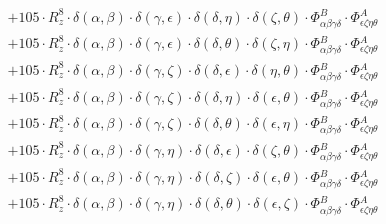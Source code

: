 \documentclass{article}
\begin{document}
\begin{equation}
\begin{array}{c}
 \\[0.2em] 		 + 105 \cdot R_{z}^{8} \cdot \delta{}\left(\alpha{}, \beta{}\right) \cdot \delta{}\left(\gamma{}, \epsilon{}\right) \cdot \delta{}\left(\delta{}, \eta{}\right) \cdot \delta{}\left(\zeta{}, \theta{}\right) \cdot \Phi{}^{B}_{\alpha{}\beta{}\gamma{}\delta{}} \cdot \Phi{}^{A}_{\epsilon{}\zeta{}\eta{}\theta{}} 
 \\[0.2em] 		 + 105 \cdot R_{z}^{8} \cdot \delta{}\left(\alpha{}, \beta{}\right) \cdot \delta{}\left(\gamma{}, \epsilon{}\right) \cdot \delta{}\left(\delta{}, \theta{}\right) \cdot \delta{}\left(\zeta{}, \eta{}\right) \cdot \Phi{}^{B}_{\alpha{}\beta{}\gamma{}\delta{}} \cdot \Phi{}^{A}_{\epsilon{}\zeta{}\eta{}\theta{}} 
 \\[0.2em] 		 + 105 \cdot R_{z}^{8} \cdot \delta{}\left(\alpha{}, \beta{}\right) \cdot \delta{}\left(\gamma{}, \zeta{}\right) \cdot \delta{}\left(\delta{}, \epsilon{}\right) \cdot \delta{}\left(\eta{}, \theta{}\right) \cdot \Phi{}^{B}_{\alpha{}\beta{}\gamma{}\delta{}} \cdot \Phi{}^{A}_{\epsilon{}\zeta{}\eta{}\theta{}} 
 \\[0.2em] 		 + 105 \cdot R_{z}^{8} \cdot \delta{}\left(\alpha{}, \beta{}\right) \cdot \delta{}\left(\gamma{}, \zeta{}\right) \cdot \delta{}\left(\delta{}, \eta{}\right) \cdot \delta{}\left(\epsilon{}, \theta{}\right) \cdot \Phi{}^{B}_{\alpha{}\beta{}\gamma{}\delta{}} \cdot \Phi{}^{A}_{\epsilon{}\zeta{}\eta{}\theta{}} 
 \\[0.2em] 		 + 105 \cdot R_{z}^{8} \cdot \delta{}\left(\alpha{}, \beta{}\right) \cdot \delta{}\left(\gamma{}, \zeta{}\right) \cdot \delta{}\left(\delta{}, \theta{}\right) \cdot \delta{}\left(\epsilon{}, \eta{}\right) \cdot \Phi{}^{B}_{\alpha{}\beta{}\gamma{}\delta{}} \cdot \Phi{}^{A}_{\epsilon{}\zeta{}\eta{}\theta{}} 
 \\[0.2em] 		 + 105 \cdot R_{z}^{8} \cdot \delta{}\left(\alpha{}, \beta{}\right) \cdot \delta{}\left(\gamma{}, \eta{}\right) \cdot \delta{}\left(\delta{}, \epsilon{}\right) \cdot \delta{}\left(\zeta{}, \theta{}\right) \cdot \Phi{}^{B}_{\alpha{}\beta{}\gamma{}\delta{}} \cdot \Phi{}^{A}_{\epsilon{}\zeta{}\eta{}\theta{}} 
 \\[0.2em] 		 + 105 \cdot R_{z}^{8} \cdot \delta{}\left(\alpha{}, \beta{}\right) \cdot \delta{}\left(\gamma{}, \eta{}\right) \cdot \delta{}\left(\delta{}, \zeta{}\right) \cdot \delta{}\left(\epsilon{}, \theta{}\right) \cdot \Phi{}^{B}_{\alpha{}\beta{}\gamma{}\delta{}} \cdot \Phi{}^{A}_{\epsilon{}\zeta{}\eta{}\theta{}} 
 \\[0.2em] 		 + 105 \cdot R_{z}^{8} \cdot \delta{}\left(\alpha{}, \beta{}\right) \cdot \delta{}\left(\gamma{}, \eta{}\right) \cdot \delta{}\left(\delta{}, \theta{}\right) \cdot \delta{}\left(\epsilon{}, \zeta{}\right) \cdot \Phi{}^{B}_{\alpha{}\beta{}\gamma{}\delta{}} \cdot \Phi{}^{A}_{\epsilon{}\zeta{}\eta{}\theta{}} 

\end{array}
\end{equation}
\end{document}

